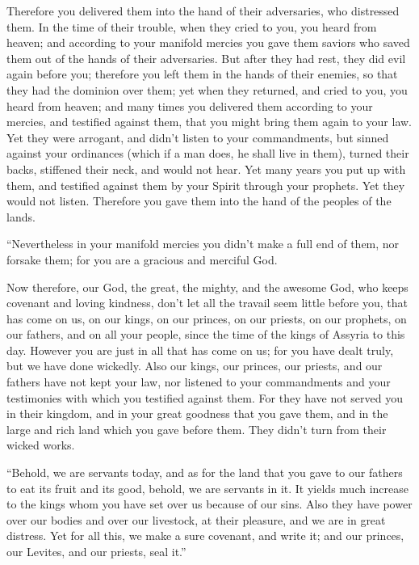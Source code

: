 {Therefore you delivered them into the hand of their adversaries, who distressed them. In the time of their trouble, when they cried to you, you heard from heaven; and according to your manifold mercies you gave them saviors who saved them out of the hands of their adversaries.
But after they had rest, they did evil again before you; therefore you left them in the hands of their enemies, so that they had the dominion over them; yet when they returned, and cried to you, you heard from heaven; and many times you delivered them according to your mercies,
and testified against them, that you might bring them again to your law. Yet they were arrogant, and didn’t listen to your commandments, but sinned against your ordinances (which if a man does, he shall live in them), turned their backs, stiffened their neck, and would not hear.
Yet many years you put up with them, and testified against them by your Spirit through your prophets. Yet they would not listen. Therefore you gave them into the hand of the peoples of the lands.
\par }{\PP {}“Nevertheless in your manifold mercies you didn’t make a full end of them, nor forsake them; for you are a gracious and merciful God.
\par }{\PP {}Now therefore, our God, the great, the mighty, and the awesome God, who keeps covenant and loving kindness, don’t let all the travail seem little before you, that has come on us, on our kings, on our princes, on our priests, on our prophets, on our fathers, and on all your people, since the time of the kings of Assyria to this day.
However you are just in all that has come on us; for you have dealt truly, but we have done wickedly.
Also our kings, our princes, our priests, and our fathers have not kept your law, nor listened to your commandments and your testimonies with which you testified against them.
For they have not served you in their kingdom, and in your great goodness that you gave them, and in the large and rich land which you gave before them. They didn’t turn from their wicked works.
\par }{\PP {}“Behold, we are servants today, and as for the land that you gave to our fathers to eat its fruit and its good, behold, we are servants in it.
It yields much increase to the kings whom you have set over us because of our sins. Also they have power over our bodies and over our livestock, at their pleasure, and we are in great distress.
Yet for all this, we make a sure covenant, and write it; and our princes, our Levites, and our priests, seal it.”

}
